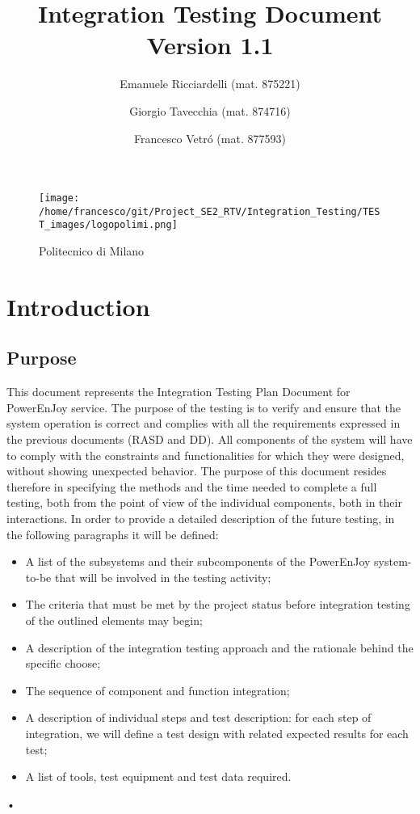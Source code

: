 \documentclass[10pt, a4paper,titlepage]{article}
\begin{document}
\begin{titlepage}
\title{Integration Testing Document \\Version 1.1}
\author{Emanuele Ricciardelli (mat. 875221) \and Giorgio Tavecchia (mat. 874716) \and Francesco Vetr\'o (mat. 877593)}
\begin{figure}
\begin{center}
\texttt{[image: /home/francesco/git/Project\_SE2\_RTV/Integration\_Testing/TEST\_images/logopolimi.png]}
\caption{Politecnico di Milano}
\label{fig:logo}
\end{center}
\end{figure}
\maketitle
\end{titlepage}
\tableofcontents
\pagebreak
\section{Introduction}
\subsection{Purpose}
This document represents the Integration Testing Plan Document for PowerEnJoy service.
The purpose of the testing is to verify and ensure that the system operation is correct and complies with all the requirements expressed in the previous documents (RASD and DD). All components of the system will have to comply with the constraints and functionalities for which they were designed, without showing unexpected behavior.
The purpose of this document resides therefore in specifying the methods and the time needed to complete a full testing, both from the point of view of the individual components, both in their interactions.
In order to provide a detailed description of the future testing, in the following paragraphs it will be defined:
\begin{itemize}
\item A list of the subsystems and their subcomponents of the PowerEnJoy system-to-be that will be involved in the testing activity;
\item The criteria that must be met by the project status before integration testing of the outlined elements may begin;
\item A description of the integration testing approach and the rationale behind the specific choose;
\item The sequence of component and function integration;
\item A description of individual steps and test description: for each step of integration, we will define a test design with related expected results for each test;
\item A list of tools, test equipment and test data required.
\end{itemize}•
\end{document}
